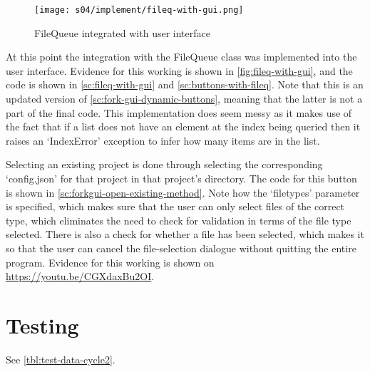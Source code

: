         \begin{figure}[!ht]
            \centering
            \texttt{[image: s04/implement/fileq-with-gui.png]}
            \caption{FileQueue integrated with user interface}
            \label{fig:fileq-with-gui}
        \end{figure}

        At this point the integration with the FileQueue class was implemented into the user interface. Evidence for this working is shown in \autoref{fig:fileq-with-gui}, and the code is shown in \autoref{sc:fileq-with-gui} and \autoref{sc:buttons-with-fileq}. 
        Note that this is an updated version of \autoref{sc:fork-gui-dynamic-buttons}, meaning that the latter is not a part of the final code. 
        This implementation does seem messy as it makes use of the fact that if a list does not have an element at the index being queried then it raises an `IndexError' exception to infer how many items are in the list.

        Selecting an existing project is done through selecting the corresponding `config.json' for that project in that project's directory. 
        The code for this button is shown in \autoref{sc:forkgui-open-existing-method}. 
        Note how the `filetypes' parameter is specified, which makes sure that the user can only select files of the correct type, which eliminates the need to check for validation in terms of the file type selected. 
        There is also a check for whether a file has been selected, which makes it so that the user can cancel the file-selection dialogue without quitting the entire program. 
        Evidence for this working is shown on \url{https://youtu.be/CGXdaxBu2OI}.
    

        

\section{Testing}
    See \autoref{tbl:test-data-cycle2}.

